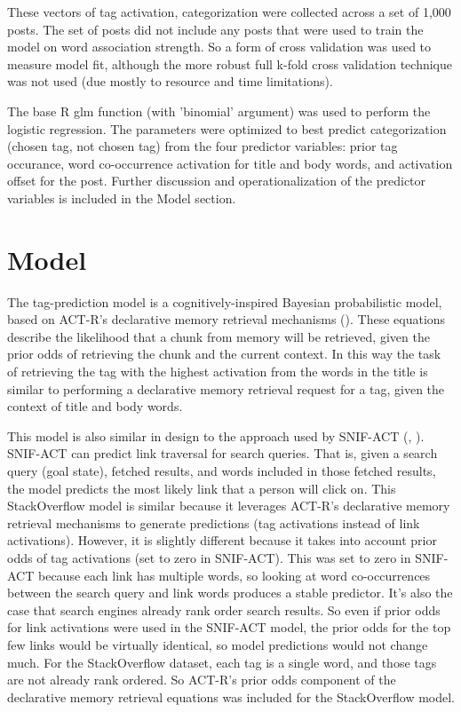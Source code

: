 \documentclass[10pt,letterpaper]{article}
\begin{document}
These vectors of tag activation, categorization were collected across a set of 1,000 posts.
The set of posts did not include any posts that were used to train the model on word association strength.
So a form of cross validation was used to measure model fit, although the more robust full k-fold cross validation technique was not used (due mostly to resource and time limitations).

The base R glm function (with 'binomial' argument) was used to perform the logistic regression.
The parameters were optimized to best predict categorization (chosen tag, not chosen tag) from the four predictor variables:
prior tag occurance, word co-occurrence activation for title and body words, and activation offset for the post.
Further discussion and operationalization of the predictor variables is included in the Model section.

\section{Model}

The tag-prediction model is a cognitively-inspired Bayesian probabilistic model, based on ACT-R's declarative memory retrieval mechanisms (\cite{Anderson2004}).
These equations describe the likelihood that a chunk from memory will be retrieved, given the prior odds of retrieving the chunk and the current context.
In this way the task of retrieving the tag with the highest activation from the words in the title is similar to performing a declarative memory retrieval request for a tag, given the context of title and body words.

This model is also similar in design to the approach used by SNIF-ACT (\cite{Fu2007}, \cite{Pirolli2003}). 
SNIF-ACT can predict link traversal for search queries.
That is, given a search query (goal state), fetched results, and words included in those fetched results, the model predicts the most likely link that a person will click on.
This StackOverflow model is similar because it leverages ACT-R's declarative memory retrieval mechanisms to generate predictions (tag activations instead of link activations).
However, it is slightly different because it takes into account prior odds of tag activations (set to zero in SNIF-ACT).
This was set to zero in SNIF-ACT because each link has multiple words, so looking at word co-occurrences between the search query and link words produces a stable predictor.
It's also the case that search engines already rank order search results.
So even if prior odds for link activations were used in the SNIF-ACT model, the prior odds for the top few links would be virtually identical, so model predictions would not change much.
For the StackOverflow dataset, each tag is a single word, and those tags are not already rank ordered.
So ACT-R's prior odds component of the declarative memory retrieval equations was included for the StackOverflow model.
\end{document}
